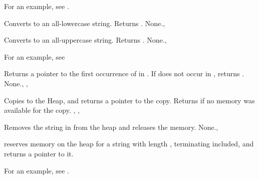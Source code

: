 For an example, see .

{
Converts  to an all-lowercase string. Returns .
}
{None.}{, }



{
Converts  to an all-uppercase string. Returns .
}
{None.}{, }

For an example, see 

{
Returns a pointer to the first occurrence of  in .
If  does not occur in , returns .
}
{None.}{, , }



{
Copies  to the Heap, and returns a pointer to the copy.
}
{Returns  if no memory was available for the copy.}
{, , }



{
Removes the string in  from the heap and releases the memory.
}
{None.}{, }



{
 reserves memory on the heap for a string with length ,
terminating  included, and returns a pointer to it.
}

For an example, see .
